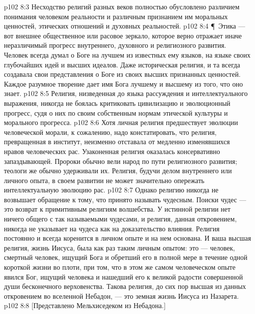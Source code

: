 \vs p102 8:3 Несходство религий разных веков полностью обусловлено различием понимания человеком реальности и различным признанием им моральных ценностей, этических отношений и духовных реальностей.
\vs p102 8:4 \P\ Этика --- вот внешнее общественное или расовое зеркало, которое верно отражает иначе неразличимый прогресс внутреннего, духовного и религиозного развития. Человек всегда думал о Боге на лучшем из известных ему языков, на языке своих глубочайших идей и высших идеалов. Даже историческая религия, и та всегда создавала свои представления о Боге из своих высших признанных ценностей. Каждое разумное творение дает имя Бога лучшему и высшему из того, что оно знает.
\vs p102 8:5 Религия, низведенная до языка рассуждения и интеллектуального выражения, никогда не боялась критиковать цивилизацию и эволюционный прогресс, судя о них по своим собственным нормам этической культуры и морального прогресса.
\vs p102 8:6 Хотя личная религия предшествует эволюции человеческой морали, к сожалению, надо констатировать, что религия, превращенная в институт, неизменно отставала от медленно изменявшихся нравов человеческих рас. Узаконенная религия оказалась консервативно запаздывающей. Пророки обычно вели народ по пути религиозного развития; теологи же обычно удерживали их. Религия, будучи делом внутреннего или личного опыта, в своем развитии не может значительно опережать интеллектуальную эволюцию рас.
\vs p102 8:7 Однако религию никогда не возвышает обращение к тому, что принято называть чудесным. Поиски чудес --- это возврат к примитивным религиям волшебства. У истинной религии нет ничего общего с так называемыми чудесами, и религия, данная откровением, никогда не указывает на чудеса как на доказательство влияния. Религия постоянно и всегда коренится в личном опыте и на нем основана. И ваша высшая религия, жизнь Иисуса, была как раз таким личным опытом: это --- человек, смертный человек, ищущий Бога и обретший его в полной мере в течение одной короткой жизни во плоти, при том, что в этом же самом человеческом опыте явился Бог, ищущий человека и нашедший его к великой радости совершенной души бесконечного верховенства. Такова религия, до сих пор высшая из данных откровением во вселенной Небадон, --- это земная жизнь Иисуса из Назарета.
\vs p102 8:8 [Представлено Мельхиседеком из Небадона.]
